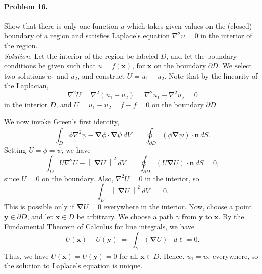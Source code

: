 \documentclass[10pt]{article}
\newcommand\ve[1]{\boldsymbol{#1}}
\newcommand\norm[1]{\left\lVert#1\right\rVert}
\newcommand\grad[1]{\ve{\nabla}#1}
\newcommand\lapl[1]{\nabla^2 #1}
\begin{document}
        \paragraph{Problem 16.} Show that there is only one function $u$ which takes given values on the (closed) boundary of a region and
        satisfies Laplace’s equation $\lapl{u} = 0$ in the interior of the region. \\

        \textit{Solution.} Let the interior of the region be labeled $D$, and let the boundary conditions be given such that $u = f(\ve{x})$,
        for $\ve{x}$ on the boundary $\partial D$. We select two solutions $u_1$ and $u_2$, and construct $U = u_1 - u_2$. Note that
        by the linearity of the Laplacian,
        \[ \lapl{U} = \lapl{(u_1 - u_2)} = \lapl{u_1} - \lapl{u_2} = 0\]
        in the interior $D$, and $U = u_1 - u_2 = f - f = 0$ on the boundary $\partial D$.

        We now invoke Green's first identity,
        \[
                \int_D \phi\lapl\psi - \grad\phi\cdot\grad\psi\: dV \;=\; \oint_{\partial D} (\phi\grad\psi) \cdot\ve{n}\: dS.
        \]
        Setting $U = \phi = \psi$, we have
        \[
                \int_D U\lapl{U} - \norm{\grad{U}}^2 \: dV \;=\; \oint_{\partial D} (U\grad{U})\cdot\ve{n}\: dS = 0,
        \]
        since $U = 0$ on the boundary. Also, $\lapl{U} = 0$ in the interior, so
        \[
                \int_D \norm{\grad{U}}^2\: dV \;=\; 0.
        \]
        This is possible only if $\grad{U} = 0$ everywhere in the interior. Now, choose a point $\ve{y} \in \partial D$, and let $\ve{x} \in D$
        be arbitrary. We choose a path $\gamma$ from $\ve{y}$ to $\ve{x}$.
        By the Fundamental Theorem of Calculus for line integrals, we have
        \[
                U(\ve{x}) - U(\ve{y}) \;=\; \int_\gamma (\grad U)\cdot\:d\ve{\ell} = 0.
        \]
        Thus, we have $U(\ve{x}) = U(\ve{y}) = 0$ for all $\ve{x} \in D$. Hence. $u_1 = u_2$ everywhere, so the solution to Laplace's equation
        is unique.
\end{document}
